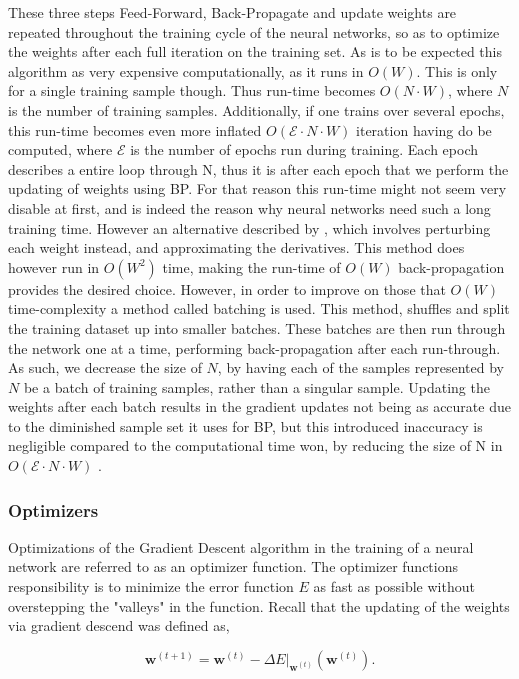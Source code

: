 These three steps Feed-Forward, Back-Propagate and update weights are repeated
throughout the training cycle of the neural networks, so as to optimize the
weights after each full iteration on the training set. As is to be expected
this algorithm as very expensive computationally, as it runs in $O(W)$. This is
only for a single training sample though. Thus run-time becomes $O(N\cdot W)$,
where $N$ is the number of training samples. Additionally, if one trains over
several epochs, this run-time becomes even more inflated $O(\mathcal{E}\cdot
N\cdot W)$ iteration having do be computed, where $\mathcal{E}$ is the number
of epochs run during training. Each epoch describes a entire loop through N,
thus it is after each epoch that we perform the updating of weights using
\gls{BP}. For that reason this run-time might not seem very disable at first,
and is indeed the reason why neural networks need such a long training time.
However an alternative described by \cite{Bishop}, which involves perturbing
each weight instead, and approximating the derivatives. This method does
however run in $O(W^2)$ time, making the run-time of $O(W)$ back-propagation
provides the desired choice. However, in order to improve on those that $O(W)$
time-complexity a method called batching is used. This method, shuffles and
split the training dataset up into smaller batches. These batches are then
run through the network one at a time, performing back-propagation after
each run-through. As such, we decrease the size of $N$, by having each of
the samples represented by $N$ be a batch of training samples, rather than
a singular sample. Updating the weights after each batch results in the
gradient updates not being as accurate due to the diminished sample set it uses
for \gls{BP}, but this introduced inaccuracy is negligible compared to the
computational time won, by reducing the size of N in $O(\mathcal{E}\cdot N\cdot
W)$ \cite{Bishop}.


\subsubsection{Optimizers}

Optimizations of the Gradient Descent algorithm in the training of a neural
network are referred to as an optimizer function. The optimizer functions
responsibility is to minimize the error function $E$ as fast as possible without
overstepping the "valleys" in the function. Recall that the updating of the
weights via gradient descend was defined as,

\begin{equation}
    \mathbf{w}^{(t+1)} =
        \mathbf{\mathbf{w}}^{(t)} -
        \Delta E|_{\mathbf{w}^{(t)}}(\mathbf{w}^{(t)}).
\end{equation}

